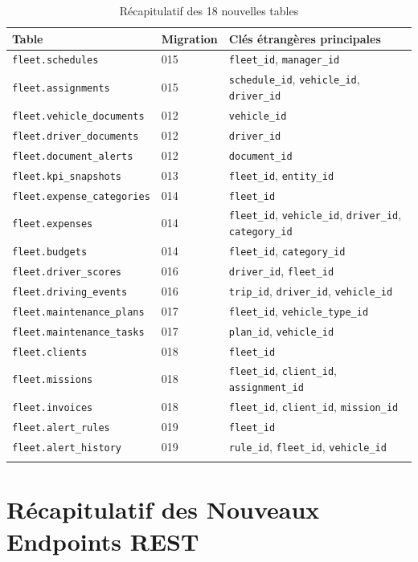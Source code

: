 \documentclass[12pt,a4paper]{report}
\begin{document}
\begin{longtable}{p{5cm}p{2.5cm}p{5.5cm}}
\toprule
\textbf{Table} & \textbf{Migration} & \textbf{Clés étrangères principales} \\
\midrule
\endhead
\texttt{fleet.schedules} & 015 & \texttt{fleet\_id}, \texttt{manager\_id} \\
\texttt{fleet.assignments} & 015 & \texttt{schedule\_id}, \texttt{vehicle\_id}, \texttt{driver\_id} \\
\texttt{fleet.vehicle\_documents} & 012 & \texttt{vehicle\_id} \\
\texttt{fleet.driver\_documents} & 012 & \texttt{driver\_id} \\
\texttt{fleet.document\_alerts} & 012 & \texttt{document\_id} \\
\texttt{fleet.kpi\_snapshots} & 013 & \texttt{fleet\_id}, \texttt{entity\_id} \\
\texttt{fleet.expense\_categories} & 014 & \texttt{fleet\_id} \\
\texttt{fleet.expenses} & 014 & \texttt{fleet\_id}, \texttt{vehicle\_id}, \texttt{driver\_id}, \texttt{category\_id} \\
\texttt{fleet.budgets} & 014 & \texttt{fleet\_id}, \texttt{category\_id} \\
\texttt{fleet.driver\_scores} & 016 & \texttt{driver\_id}, \texttt{fleet\_id} \\
\texttt{fleet.driving\_events} & 016 & \texttt{trip\_id}, \texttt{driver\_id}, \texttt{vehicle\_id} \\
\texttt{fleet.maintenance\_plans} & 017 & \texttt{fleet\_id}, \texttt{vehicle\_type\_id} \\
\texttt{fleet.maintenance\_tasks} & 017 & \texttt{plan\_id}, \texttt{vehicle\_id} \\
\texttt{fleet.clients} & 018 & \texttt{fleet\_id} \\
\texttt{fleet.missions} & 018 & \texttt{fleet\_id}, \texttt{client\_id}, \texttt{assignment\_id} \\
\texttt{fleet.invoices} & 018 & \texttt{fleet\_id}, \texttt{client\_id}, \texttt{mission\_id} \\
\texttt{fleet.alert\_rules} & 019 & \texttt{fleet\_id} \\
\texttt{fleet.alert\_history} & 019 & \texttt{rule\_id}, \texttt{fleet\_id}, \texttt{vehicle\_id} \\
\bottomrule
\caption{Récapitulatif des 18 nouvelles tables}
\end{longtable}

\chapter{Récapitulatif des Nouveaux Endpoints REST}
\end{document}
